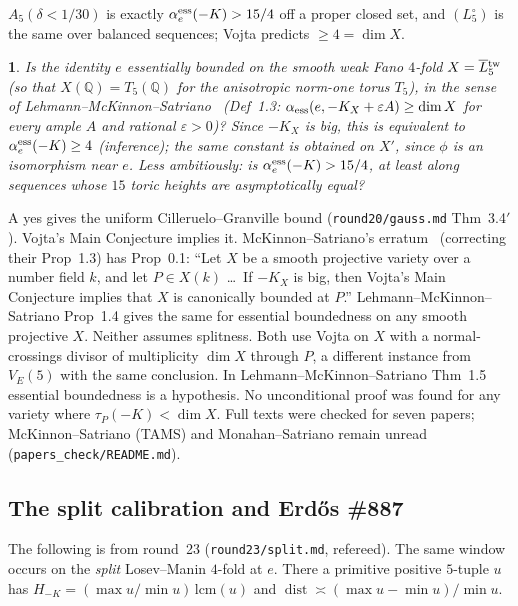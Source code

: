\documentclass[11pt]{article}
\newcommand{\namedname}{}
\newtheorem*{namedinner}{\namedname}
\newenvironment{named}[1]{\renewcommand{\namedname}{#1}\begin{namedinner}}{\end{namedinner}}
\newcommand{\Q}{\mathbb Q}
\newcommand{\dist}{\operatorname{dist}}
\newcommand{\Ltw}[1]{\overline L{}^{\rm tw}_{#1}}
\newcommand{\rec}[1]{\texttt{#1}}
\begin{document}
\(A_5(\delta<1/30)\) is exactly \(\alpha^{\rm ess}_e(-K)>15/4\) off a proper
closed set, and \((L_5^\circ)\) is the same over balanced sequences; Vojta
predicts \(\ge4=\dim X\).

\begin{named}{Question B, literature form}
Is the identity \(e\) \emph{essentially bounded} on the smooth weak Fano
\(4\)-fold \(X=\Ltw5\) (so that \(X(\Q)=T_5(\Q)\) for the anisotropic norm-one
torus \(T_5\)), in the sense of Lehmann--McKinnon--Satriano~\cite{LMS2024}
(Def~1.3: \(\alpha_{\rm ess}(e,-K_X+\varepsilon A)\ge\dim X\) for every ample
\(A\) and rational \(\varepsilon>0\))?  Since \(-K_X\) is big, this is
equivalent to \(\alpha^{\rm ess}_e(-K)\ge4\) (inference); the same constant is
obtained on \(X'\), since \(\phi\) is an isomorphism near \(e\).  Less
ambitiously: is
\(\alpha^{\rm ess}_e(-K)>15/4\), at least along sequences whose \(15\) toric
heights are asymptotically equal?
\end{named}

A yes gives the uniform Cilleruelo--Granville bound (\rec{round20/gauss.md}
Thm~3.4\('\)).  Vojta's Main Conjecture implies it.  McKinnon--Satriano's
erratum~\cite{McKinnonSatriano2021} (correcting their Prop~1.3) has Prop~0.1:
``Let \(X\) be a smooth projective variety over a number field \(k\), and let
\(P\in X(k)\) \dots\ If \(-K_X\) is big, then Vojta's Main Conjecture implies
that \(X\) is canonically bounded at \(P\).''  Lehmann--McKinnon--Satriano
Prop~1.4 gives the same for essential boundedness on any smooth projective
\(X\).  Neither assumes splitness.  Both use Vojta on \(X\) with a
normal-crossings divisor of multiplicity \(\dim X\) through \(P\), a different
instance from \(V_E(5)\) with the same conclusion.  In
Lehmann--McKinnon--Satriano Thm~1.5 essential boundedness is a hypothesis.  No
unconditional proof was found for any variety where \(\tau_P(-K)<\dim X\).
Full texts were checked for seven papers; McKinnon--Satriano (TAMS) and
Monahan--Satriano remain unread (\rec{papers_check/README.md}).

\subsection{The split calibration and \texorpdfstring{Erd\H{o}s \#887}{Erdős \#887}}

The following is from round~23 (\rec{round23/split.md}, refereed).  The same
window occurs on the \emph{split} Losev--Manin \(4\)-fold at \(e\).  There a
primitive positive \(5\)-tuple \(u\) has
\(H_{-K}=(\max u/\min u)\,\mathrm{lcm}(u)\) and
\(\dist\asymp(\max u-\min u)/\min u\).
\end{document}
